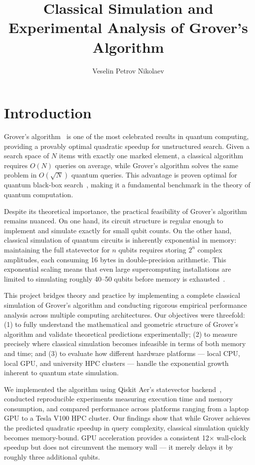 \documentclass[sigconf, authorversion=true, nonacm=true]{acmart}
\title{Classical Simulation and Experimental Analysis of Grover's Algorithm}
\author{Veselin Petrov Nikolaev}
\affiliation{%
  \institution{University of Luxembourg}
  \department{Faculty of Science, Technology and Medicine}
  \country{Luxembourg}
}
\begin{document}
\maketitle

\section{Introduction}

Grover's algorithm~\cite{Grover1996} is one of the most celebrated results in quantum computing, providing a provably optimal quadratic speedup for unstructured search. Given a search space of $N$ items with exactly one marked element, a classical algorithm requires $O(N)$ queries on average, while Grover's algorithm solves the same problem in $O(\sqrt{N})$ quantum queries. This advantage is proven optimal for quantum black-box search~\cite{Bennett1997}, making it a fundamental benchmark in the theory of quantum computation.

Despite its theoretical importance, the practical feasibility of Grover's algorithm remains nuanced. On one hand, its circuit structure is regular enough to implement and simulate exactly for small qubit counts. On the other hand, classical simulation of quantum circuits is inherently exponential in memory: maintaining the full statevector for $n$ qubits requires storing $2^n$ complex amplitudes, each consuming 16 bytes in double-precision arithmetic. This exponential scaling means that even large supercomputing installations are limited to simulating roughly 40--50 qubits before memory is exhausted~\cite{Smelyanskiy2016, Haener2017}.

This project bridges theory and practice by implementing a complete classical simulation of Grover's algorithm and conducting rigorous empirical performance analysis across multiple computing architectures. Our objectives were threefold: (1) to fully understand the mathematical and geometric structure of Grover's algorithm and validate theoretical predictions experimentally; (2) to measure precisely where classical simulation becomes infeasible in terms of both memory and time; and (3) to evaluate how different hardware platforms — local CPU, local GPU, and university HPC clusters — handle the exponential growth inherent to quantum state simulation.

We implemented the algorithm using Qiskit Aer's statevector backend~\cite{Qiskit}, conducted reproducible experiments measuring execution time and memory consumption, and compared performance across platforms ranging from a laptop GPU to a Tesla V100 HPC cluster. Our findings show that while Grover achieves the predicted quadratic speedup in query complexity, classical simulation quickly becomes memory-bound. GPU acceleration provides a consistent 12$\times$ wall-clock speedup but does not circumvent the memory wall — it merely delays it by roughly three additional qubits.
\end{document}
